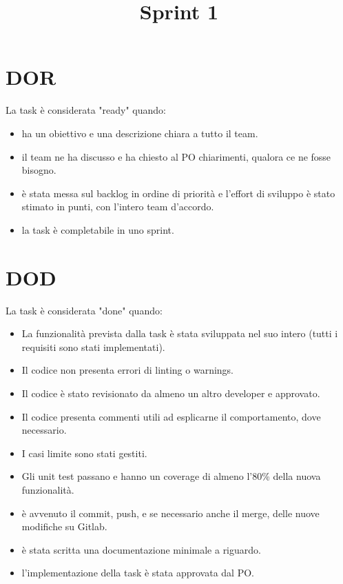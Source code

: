\documentclass{article}
\title{Sprint 1}
\author{}
\date{}
\begin{document}
\maketitle

\section*{DOR}
La task è considerata "ready" quando:
\begin{itemize}[leftmargin=*]
    \item ha un obiettivo e una descrizione chiara a tutto il team.
    \item il team ne ha discusso e ha chiesto al PO chiarimenti, qualora ce ne fosse bisogno.
    \item è stata messa sul backlog in ordine di priorità e l'effort di sviluppo è stato stimato in punti, con l'intero team d'accordo.
    \item la task è completabile in uno sprint.
\end{itemize}

\section*{DOD}
La task è considerata "done" quando:
\begin{itemize}[leftmargin=*]
    \item La funzionalità prevista dalla task è stata sviluppata nel suo intero (tutti i requisiti sono stati implementati).
    \item Il codice non presenta errori di linting o warnings.
    \item Il codice è stato revisionato da almeno un altro developer e approvato.
    \item Il codice presenta commenti utili ad esplicarne il comportamento, dove necessario.
    \item I casi limite sono stati gestiti.
    \item Gli unit test passano e hanno un coverage di almeno l'80\% della nuova funzionalità.
    \item è avvenuto il commit, push, e se necessario anche il merge, delle nuove modifiche su Gitlab.
    \item è stata scritta una documentazione minimale a riguardo.
    \item l'implementazione della task è stata approvata dal PO.
\end{itemize}
\end{document}

